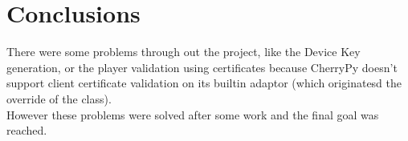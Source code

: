 \documentclass[11pt,a4paper]{report}
\begin{document}
\chapter{Conclusions}

There were some problems through out the project, like the Device Key generation, or the player validation using certificates because CherryPy doesn't support client certificate validation on its builtin adaptor (which originatesd the override of the class).\\

However these problems were solved after some work and the final goal was reached. 





\end{document}
